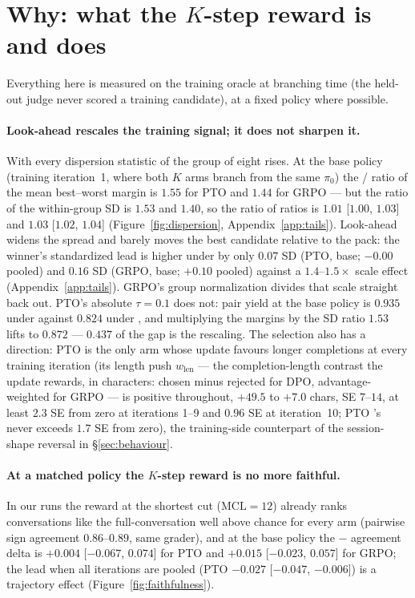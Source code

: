 \section{Why: what the $K$-step reward is and does}
\label{sec:mechanism}

Everything here is measured on the training oracle at branching time (the held-out judge never
scored a training candidate), at a fixed policy where possible.

\paragraph{Look-ahead rescales the training signal; it does not sharpen it.} With \Kf{} every
dispersion statistic of the group of eight rises. At the base policy (training iteration~1,
where both $K$ arms branch from the same $\pi_0$) the \Kf{}/\Kz{} ratio of the mean best--worst
margin is $1.55$ for PTO and $1.44$ for GRPO --- but the ratio of the within-group SD is $1.53$
and $1.40$, so the ratio of ratios is $1.01$ [$1.00$, $1.03$] and $1.03$ [$1.02$, $1.04$]
(Figure~\ref{fig:dispersion}, Appendix~\ref{app:tails}). Look-ahead widens the spread and barely
moves the best candidate relative to the pack: the winner's standardized lead is higher under
\Kf{} by only $0.07$ SD (PTO, base; $-0.00$ pooled) and $0.16$ SD (GRPO, base; $+0.10$ pooled)
against a $1.4$--$1.5\times$ scale effect (Appendix~\ref{app:tails}). GRPO's group normalization divides that scale straight back out. PTO's
absolute $\tau{=}0.1$ does not: pair yield at the base policy is $0.935$ under \Kf{} against
$0.824$ under \Kz{}, and multiplying the \Kz{} margins by the SD ratio $1.53$ lifts \Kz{} to
$0.872$ --- $0.437$ of the gap is the rescaling. The selection also has a direction: PTO \Kf{}
is the only arm whose update favours longer completions at every training iteration (its length
push $w_{\text{len}}$ --- the completion-length contrast the update rewards, in characters:
chosen minus rejected for DPO, advantage-weighted for GRPO --- is positive throughout, $+49.5$ to
$+7.0$ chars, SE $7$--$14$, at least $2.3$ SE from zero at iterations 1--9 and $0.96$ SE at
iteration~10; PTO \Kz{}'s never exceeds $1.7$ SE from zero), the training-side counterpart of the session-shape reversal in
\S\ref{sec:behaviour}.

\paragraph{At a matched policy the $K$-step reward is no more faithful.} In our runs the reward
at the shortest cut ($\text{MCL}{=}12$) already ranks conversations like the full-conversation \QQ{}
well above chance for every arm (pairwise sign agreement $0.86$--$0.89$, same grader), and at
the base policy the \Kz{}$-$\Kf{} agreement delta is $+0.004$ [$-0.067$, $0.074$] for PTO and
$+0.015$ [$-0.023$, $0.057$] for GRPO; the \Kf{} lead when all iterations are pooled (PTO
$-0.027$ [$-0.047$, $-0.006$]) is a trajectory effect (Figure~\ref{fig:faithfulness}).

